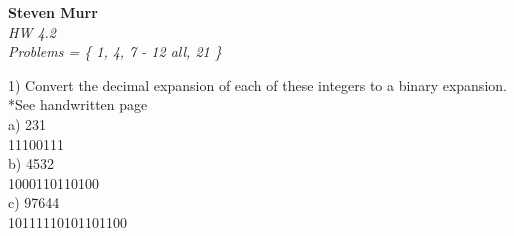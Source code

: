 \documentclass{article}
\begin{document}
\setcounter{totalnumber}{5}
   \begin{flushright}
      \Large\textbf{Steven Murr}\\
      \large\textit{HW 4.2} \\
      \large\textit{ Problems =  \{ 1, 4, 7 - 12 all, 21 \} } \\
   \end{flushright}
\begin{flushleft}
\makeatletter%
\setlength{\@fptop}{5pt}
\makeatother
\setlength\parindent{0pt}1) Convert the decimal expansion of each of these integers to a binary expansion. {\tiny **See handwritten page}\\
\setlength\parindent{24pt}a) 231 \\
\setlength\parindent{48pt} 11100111 \\
\setlength\parindent{24pt}b) 4532 \\
\setlength\parindent{48pt} 1000110110100 \\
\setlength\parindent{24pt}c) 97644 \\
\setlength\parindent{48pt} 10111110101101100 \\


\end{flushleft}
\end{document}
